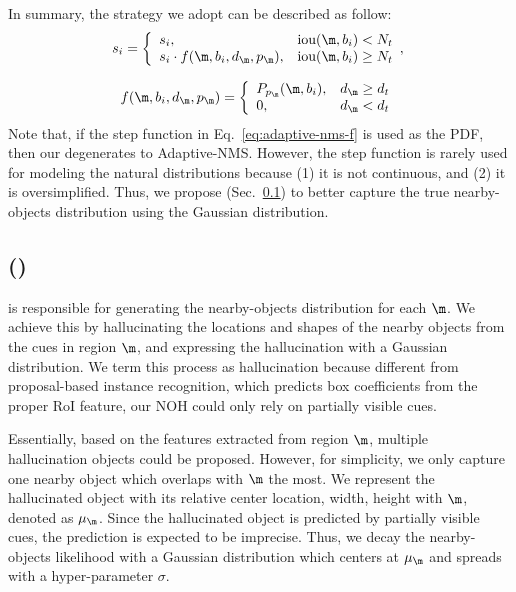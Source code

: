 \documentclass[sigconf]{acmart}
\begin{document}
In summary, the strategy we adopt can be described as follow:
\begin{equation}
    s_i=\left\{
        \begin{array}{ll}
            s_i,
            &\text{iou}(\m, b_i) < N_t 
            \\
            s_i \cdot f(\m, b_i, d_\m, p_\m),
            &\text{iou}(\m, b_i) \geq N_t
        \end{array}
        ,
        \right.
    \label{eq:our-nms}
\end{equation}


 \begin{equation}
    f(\m, b_i, d_\m, p_\m)=\left\{
        \begin{array}{ll}
            P_{p_\m}(\m, b_i),
            &d_\m \geq d_t
            \\
            0,
            &d_\m < d_t
        \end{array}
        \right.
    \label{eq:our-nms-f}
\end{equation} 
Note that, if the step function in Eq.~\ref{eq:adaptive-nms-f} is used as the PDF, then our \nmsname{} degenerates to Adaptive-NMS. However, the step function is rarely used for modeling the natural distributions because (1) it is not continuous, and (2) it is oversimplified. Thus, we propose \heatmapnameshort{} (Sec.~\ref{sec:heatmap}) to better capture the true nearby-objects distribution using the Gaussian distribution. 

\subsection{\heatmapname{} (\heatmapnameshort{})}
\label{sec:heatmap}
\heatmapnameshort{} is responsible for generating the nearby-objects distribution for each $\m$. We achieve this by hallucinating the locations and shapes of the nearby objects from the cues in region $\m$, and expressing the hallucination with a Gaussian distribution. We term this process as hallucination because different from proposal-based instance recognition, which predicts box coefficients from the proper RoI feature, our NOH could only rely on partially visible cues.

Essentially, based on the features extracted from region $\m$, multiple hallucination objects could be proposed. However, for simplicity, we only capture one nearby object which overlaps with $\m$ the most. We represent the hallucinated object with its relative center location, width, height with $\m$, denoted as $\mu_\m$. Since the hallucinated object is predicted by partially visible cues, the prediction is expected to be imprecise. Thus, we decay the nearby-objects likelihood with a Gaussian distribution which centers at $\mu_\m$ and spreads with a hyper-parameter $\sigma$.
\end{document}
